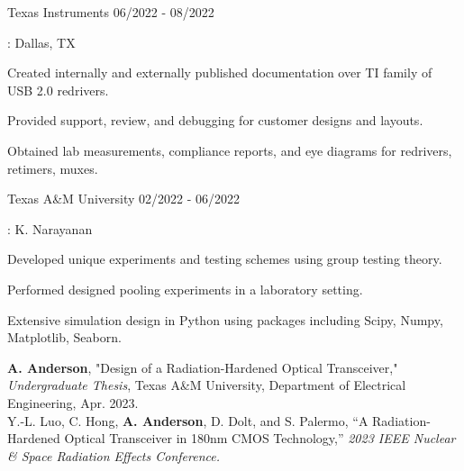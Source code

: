 \documentclass[11pt]{article}
\begin{document}
\begin{description}
\squish
{}
            {Texas Instruments}
            {06/2022 - 08/2022}

\underline{}: Dallas, TX
            
\textbullet \space Created internally and externally published documentation over TI family of USB 2.0 redrivers.

\textbullet \space Provided support, review, and debugging for customer designs and layouts. 

\textbullet \space Obtained lab measurements, compliance reports, and eye diagrams for redrivers, retimers, muxes.
      
\end{description}

\begin{description}
\squish
{}
            {Texas A\&M University}
            {02/2022 - 06/2022}

\underline{}: K. Narayanan

\textbullet \space Developed unique experiments and testing schemes using group testing theory.

\textbullet \space Performed designed pooling experiments in a laboratory setting.

\textbullet \space Extensive simulation design in Python using packages including Scipy, Numpy, Matplotlib, Seaborn.

\end{description}


\textbf{A. Anderson}, "Design of a Radiation-Hardened Optical Transceiver," \textit{Undergraduate Thesis}, Texas A\&M University, Department of Electrical Engineering, Apr. 2023. \\

Y.-L. Luo, C. Hong, \textbf{A. Anderson}, D. Dolt, and S. Palermo, “A Radiation-Hardened Optical Transceiver in 180nm CMOS Technology,” \textit{2023 IEEE Nuclear \& Space Radiation Effects Conference.} \\

\end{document}
